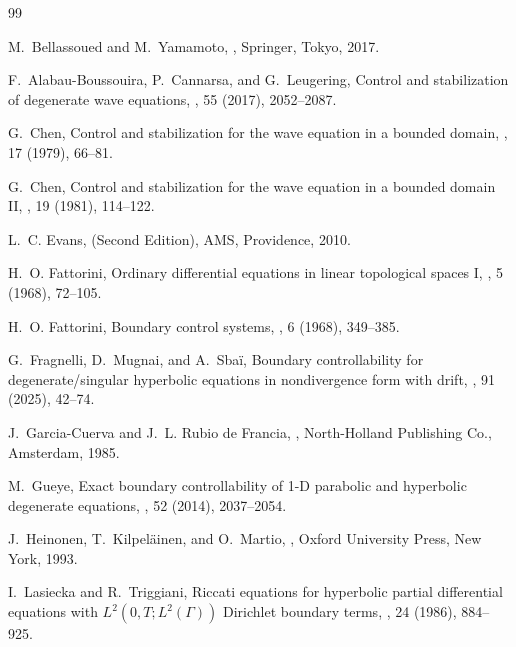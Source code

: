 \documentclass[preprint,12pt]{elsarticle}
\theoremstyle{definition}   %
\numberwithin{equation}{section}
\begin{document}
\begin{thebibliography}{99}

M.~Bellassoued and M.~Yamamoto,
,
\newblock Springer, Tokyo, 2017.

F.~Alabau-Boussouira, P.~Cannarsa, and G.~Leugering,
\newblock Control and stabilization of degenerate wave equations,
, 55 (2017), 2052--2087.

G.~Chen,
\newblock Control and stabilization for the wave equation in a bounded domain,
, 17 (1979), 66--81.

G.~Chen,
\newblock Control and stabilization for the wave equation in a bounded domain II,
, 19 (1981), 114--122.

L.~C. Evans,
 (Second Edition),
\newblock AMS, Providence, 2010.

H.~O. Fattorini,
\newblock Ordinary differential equations in linear topological spaces I,
, 5 (1968), 72--105.

H.~O. Fattorini,
\newblock Boundary control systems,
, 6 (1968), 349--385.

G.~Fragnelli, D.~Mugnai, and A.~Sbaï,
\newblock Boundary controllability for degenerate/singular hyperbolic equations in nondivergence form with drift,
, 91 (2025), 42--74.

J.~Garcia-Cuerva and J.~L. Rubio de Francia,
,
\newblock North-Holland Publishing Co., Amsterdam, 1985.

M.~Gueye,
\newblock Exact boundary controllability of 1-D parabolic and hyperbolic degenerate equations,
, 52 (2014), 2037--2054.

J.~Heinonen, T.~Kilpeläinen, and O.~Martio,
,
\newblock Oxford University Press, New York, 1993.

I.~Lasiecka and R.~Triggiani,
\newblock Riccati equations for hyperbolic partial differential equations with $L^2(0,T;L^2(\Gamma))$ Dirichlet boundary terms,
, 24 (1986), 884--925.


\end{thebibliography}
\end{document}
